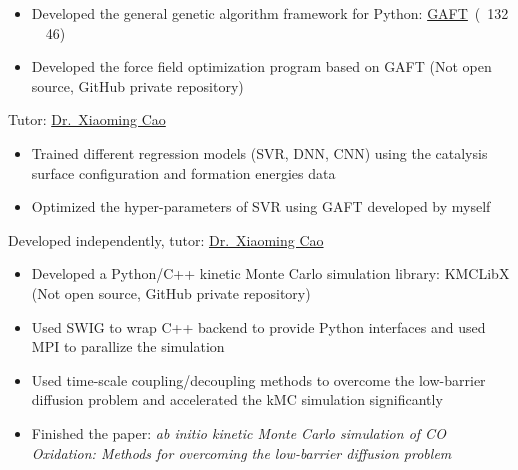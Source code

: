 \documentclass{resume}
\begin{document}
\begin{onehalfspacing}
\begin{itemize}
    \item Developed the general genetic algorithm framework for Python: \faLink \href{https://github.com/PytLab/gaft}{GAFT}\ (\faStar\ 132 \ \faCodeFork\ 46)
  \item Developed the force field optimization program based on GAFT (Not open source, GitHub private repository)
\end{itemize}
\end{onehalfspacing}

 {Tutor: \faLink \href{http://chem.ecust.edu.cn/2014/1211/c6655a50467/page.htm}{Dr.\ Xiaoming Cao}}
\begin{onehalfspacing}
\begin{itemize}
    \item Trained different regression models (SVR, DNN, CNN) using the catalysis surface configuration and formation energies data
    \item Optimized the hyper-parameters of SVR using GAFT developed by myself
\end{itemize}
\end{onehalfspacing}

 {Developed independently, tutor: \faLink \href{http://chem.ecust.edu.cn/2014/1211/c6655a50467/page.htm}{Dr.\ Xiaoming Cao}}
\begin{onehalfspacing}
\begin{itemize}
    \item Developed a Python/C++ kinetic Monte Carlo simulation library: KMCLibX (Not open source, GitHub private repository)
    \item Used SWIG to wrap C++ backend to provide Python interfaces and used MPI to parallize the simulation
    \item Used time-scale coupling/decoupling methods to overcome the low-barrier diffusion problem and accelerated the kMC simulation significantly
    \item Finished the paper: \emph{ab initio kinetic Monte Carlo simulation of CO Oxidation: Methods for overcoming the low-barrier diffusion problem}
\end{itemize}
\end{onehalfspacing}
\end{document}
